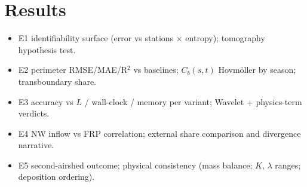 \section{Results}
\begin{itemize}
  \item E1 identifiability surface (error vs stations $\times$ entropy); tomography hypothesis test.
  \item E2 perimeter RMSE/MAE/R$^2$ vs baselines; $C_b(s,t)$ Hovm\"oller by season; transboundary share.
  \item E3 accuracy vs $L$ / wall-clock / memory per variant; Wavelet + physics-term verdicts.
  \item E4 NW inflow vs FRP correlation; external share comparison and divergence narrative.
  \item E5 second-airshed outcome; physical consistency (mass balance; $K$, $\lambda$ ranges; deposition ordering).
\end{itemize}

